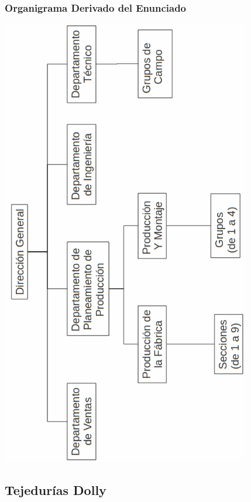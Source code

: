 \documentclass[a4paper,10pt,titlepage]{article}
\begin{document}
\subsubsection{Organigrama Derivado del Enunciado}
\begin{center}
\includegraphics[width=310pt]{./herculesDiag.png}
 \end{center}




\newpage
\subsection{Tejedur\'ias Dolly}
\end{document}
